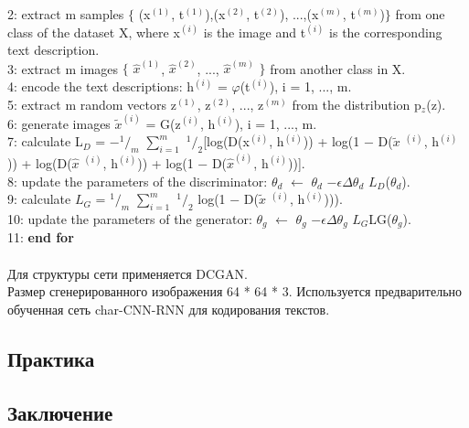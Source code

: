 \documentclass{article}
\begin{document}
    2: \indent extract m samples $\{$ (x$^(1)$, t$^{(1)}$),(x$^{(2)}$, t$^{(2)}$), ...,(x$^{(m)}$, t$^{(m)}$)$\}$ from one class of the dataset X, where x$^{(i)}$ is the image and t$^{(i)}$ is the corresponding text description.\\
    3: \indent extract m images $\{$ $\hat{x}^{(1)}$, $\hat{x}^{(2)}$, ..., $\hat{x}^{(m)}$ $\}$ from another class in X.\\
    4: \indent encode the text descriptions: h$^{(i)}$ = $\varphi$(t$^{(i)}$), i = 1, ..., m.\\
    5: \indent extract m random vectors {z$^{(1)}$, z$^{(2)}$, ..., z$^{(m)}$} from the distribution p$_z$(z).\\
    6: \indent generate images $\widetilde{x}^{(i)}$ = G(z$^{(i)}$, h$^{(i)}$), i = 1, ..., m.\\
    7: \indent calculate L$_D$ = −$^1/_m$ $\sum_{i=1}^{m}$ $^1/_2$[log(D(x$^{(i)}$, h$^{(i)}$)) + log(1 − D($\widetilde{x}$ $^{(i)}$, h$^{(i)}$)) + log(D($\hat{x}$ $^{(i)}$, h$^{(i)}$)) + log(1 − D($\hat{x}^{(i)}$, h$^{(i)}$))].\\
    8: \indent update the parameters of the discriminator: $\theta _{d}$ $\leftarrow$ $\theta _{d}$ $- \epsilon \Delta$$\theta _{d}$ $L_{D}$($\theta _{d}$).\\
    9: \indent calculate $L_{G}$ = $^1/_m$ $\sum_{i=1}^{m}$ $^1/_2$ log(1 − D($\widetilde{x}$ $^{(i)}$, h$^{(i)}$))).\\
    10: \indent update the parameters of the generator: $\theta _{g}$ $\leftarrow$ $\theta _{g}$ $ - \epsilon \Delta$$\theta _{g}$ $L_{G}$LG($\theta _{g}$).\\
    11: \textbf {end for}
    \\ \\ 
    Для структуры сети применяется DCGAN. \\
    Размер сгенерированного изображения 64 * 64 * 3. Используется предварительно обученная сеть char-CNN-RNN для кодирования текстов.
    
    \newpage
    \begin{center} 
    \section{Практика}
    \end{center}
    \large
    
    \newpage
    \begin{center} 
    \section{Заключение}
    \end{center}
    \large
    
\end{document}
